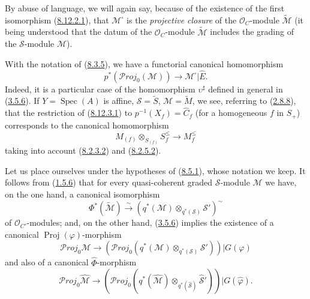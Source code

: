 By abuse of language, we will again say, because of the existence of the first
isomorphism (\hyperref[II.8.12.2.1]{8.12.2.1}), that
$\mathcal{M}^{\square}$ is the \emph{projective closure} of the
$\mathcal{O}_C$-module $\widetilde{\mathcal{M}}$ (it being understood that the
datum of the $\mathcal{O}_C$-module $\widetilde{\mathcal{M}}$ includes the
grading of the $\mathcal{S}$-module $\mathcal{M}$).

\begin{env}[8.12.3]
\label{II.8.12.3}
With the notation of (\hyperref[II.8.3.5]{8.3.5}), we have a functorial
canonical homomorphism
\begin{equation}
\label{II.8.12.3.1}
  p^*(\mathcal{P}\mathit{roj}_0(\mathcal{M}))
  \to\mathcal{M}^{\square}|\widehat{E}.
\tag{8.12.3.1}
\end{equation}
Indeed, it is a particular case of the homomorphism $\upsilon^{\sharp}$ defined in
general in (\hyperref[II.3.5.6]{3.5.6}). If
$Y=\operatorname{Spec}(A)$ is affine, $\mathcal{S}=\widetilde{S}$,
$\mathcal{M}=\widetilde{M}$, we see, referring to
(\hyperref[II.2.8.8]{2.8.8}), that the restriction of
(\hyperref[II.8.12.3.1]{8.12.3.1}) to
$p^{-1}(X_f)=\widehat{C}_f$ (for a homogeneous $f$ in $S_+$) corresponds to
the canonical homomorphism
\begin{equation}
\label{II.8.12.3.2}
  M_{(f)}\otimes_{S_{(f)}}S_f^{\leq}\to M_f^{\leq}
\tag{8.12.3.2}
\end{equation}
taking into account (\hyperref[II.8.2.3.2]{8.2.3.2}) and
(\hyperref[II.8.2.5.2]{8.2.5.2}).
\end{env}

\begin{env}[8.12.4]
\label{II.8.12.4}
Let us place ourselves under the hypotheses of (\hyperref[II.8.5.1]{8.5.1}),
whose notation we keep. It follows from
(\hyperref[II.1.5.6]{1.5.6}) that for every quasi-coherent graded
$\mathcal{S}$-module $\mathcal{M}$ we have, on the one hand, a canonical
isomorphism
\begin{equation}
\label{II.8.12.4.1}
  \Phi^*(\widetilde{\mathcal{M}})
  \xrightarrow{\sim}
  \left(q^*(\mathcal{M})\otimes_{q^*(\mathcal{S})}\mathcal{S}'\right)^{\sim}
\tag{8.12.4.1}
\end{equation}
of $\mathcal{O}_{C'}$-modules; and, on the other hand,
(\hyperref[II.3.5.6]{3.5.6}) implies the existence of a canonical
$\operatorname{Proj}(\varphi)$-morphism
\begin{equation}
\label{II.8.12.4.2}
  \mathcal{P}\mathit{roj}_0\mathcal{M}\to
  \left(\mathcal{P}\mathit{roj}_0
  (q^*(\mathcal{M})\otimes_{q^*(\mathcal{S})}\mathcal{S}')\right)
  |G(\varphi)
\tag{8.12.4.2}
\end{equation}
and also of a canonical $\widehat{\Phi}$-morphism
\begin{equation}
\label{II.8.12.4.3}
  \mathcal{P}\mathit{roj}_0\widehat{\mathcal{M}}\to
  \left(\mathcal{P}\mathit{roj}_0
  (q^*(\widehat{\mathcal{M}})
  \otimes_{q^*(\widehat{\mathcal{S}})}\widehat{\mathcal{S}}')\right)
  |G(\widehat{\varphi}).
\tag{8.12.4.3}
\end{equation}
\end{env}

